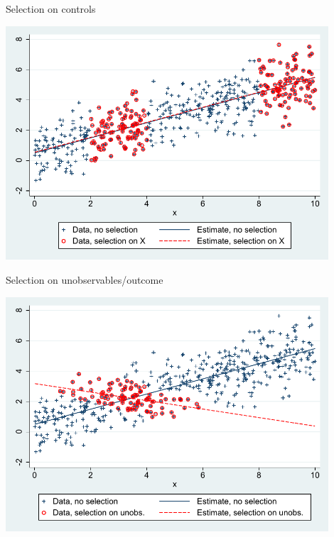 \documentclass[pdftex]{beamer}
\begin{document}
\begin{frame}{Selection on controls}
\begin{center}
	\includegraphics[width=0.9\textwidth]{graphs/selection_exog.pdf}
\end{center}
\end{frame}

\begin{frame}{Selection on unobservables/outcome}
\begin{center}
	\includegraphics[width=0.9\textwidth]{graphs/selection_endog.pdf}
\end{center}
\end{frame}
\end{document}
